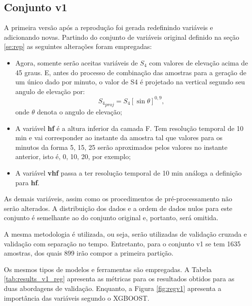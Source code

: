 
\subsection{Conjunto v1}\label{sec:v1}

A primeira versão após a reprodução foi gerada redefinindo variáveis e adicionando novas. Partindo do conjunto de variáveis original definido na seção \ref{se:rep} as seguintes alterações foram empregadas:

\begin{itemize}
\item Agora, somente serão aceitas variáveis de $S_4$ com valores de elevação acima de 45 graus. E, antes do processo de combinação das amostras para a geração de um único dado por minuto, o valor de S4 é projetado na vertical segundo seu angulo de elevação por:
\begin{equation}
{S_4}_{proj}=S_4[\sin\theta]^{0,9}\mbox{,}~
\end{equation}
onde $\theta$ denota o angulo de elevação;
\item A variável {\bf hf} é a altura inferior da camada F. Tem resolução temporal de 10 min e vai corresponder ao instante da amostra tal que valores para os minutos da forma 5, 15, 25 serão aproximados pelos valores no instante anterior, isto é, 0, 10, 20, por exemplo;
\item A variável {\bf vhf} passa a ter resolução temporal de 10 min análoga a definição para {\bf hf}.
\end{itemize}

As demais variáveis, assim como os procedimentos de pré-processamento não serão alterados. A distribuição dos dados e a ordem de dados nulos para este conjunto é semelhante ao do conjunto original e, portanto, será omitida.

A mesma metodologia é utilizada, ou seja, serão utilizadas de validação cruzada e validação com separação no tempo. Entretanto, para o conjunto v1 se tem 1635 amostras, dos quais 899 irão compor a primeira partição.

Os mesmos tipos de modelos e ferramentas são empregadas. A Tabela \ref{tab:results_v1_reg} apresenta as métricas para os resultados obtidos para as duas abordagens de validação. Enquanto, a Figura \ref{fig:regv1} apresenta a importância das variáveis segundo o XGBOOST.

